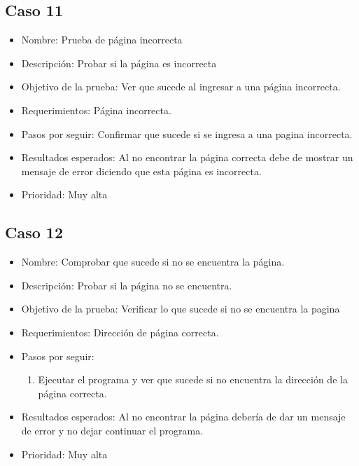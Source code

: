 \documentclass[conference]{IEEEtran}
\begin{document}
\subsection{Caso 11}
\begin{itemize}
\item Nombre: Prueba de página incorrecta
\item Descripción: Probar si la página es incorrecta
\item Objetivo de la prueba: Ver que sucede al ingresar a una página incorrecta.
\item Requerimientos: Página incorrecta.
\item Pasos por seguir: Confirmar que sucede si se ingresa a una pagina incorrecta.
\item Resultados esperados: Al no encontrar la página correcta debe de mostrar un mensaje de error diciendo que esta página es incorrecta.
\item Prioridad: Muy alta
\end{itemize}

\subsection{Caso 12}
\begin{itemize}
\item Nombre: Comprobar que sucede si no se encuentra la página.
\item Descripción: Probar si la página no se encuentra.
\item Objetivo de la prueba: Verificar lo que sucede si no se encuentra la pagina
\item Requerimientos: Dirección de página correcta.
\item Pasos por seguir: 
\begin{enumerate}
\item Ejecutar el programa y ver que sucede si no encuentra la dirección de la página correcta.
\end{enumerate}
\item Resultados esperados: Al no encontrar la página debería de dar un mensaje de error y no dejar continuar el programa.
\item Prioridad: Muy alta 
\end{itemize}


\end{document}
